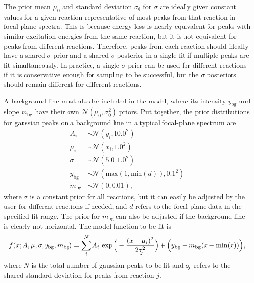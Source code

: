 The prior mean $\mu_{0}$ and standard deviation $\sigma_{0}$ for $\sigma$ are ideally given constant values for a given reaction representative of most peaks from that reaction in focal-plane spectra. This is because energy loss is nearly equivalent for peaks with similar excitation energies from the same reaction, but it is not equivalent for peaks from different reactions. Therefore, peaks from each reaction should ideally have a shared $\sigma$ prior and a shared $\sigma$ posterior in a single fit if multiple peaks are fit simultaneously. In practice, a single $\sigma$ prior can be used for different reactions if it is conservative enough for sampling to be successful, but the $\sigma$ posteriors should remain different for different reactions. 

A background line must also be included in the model, where its intensity $y_{\mathrm{bg}}$ and slope $m_{\mathrm{bg}}$ have their own $\mathcal{N}(\mu_{0}, \sigma_{0}^{2})$ priors. Put together, the prior distributions for gaussian peaks on a background line in a typical focal-plane spectrum are
\begin{align}
    A_{i} &\sim \mathcal{N}(y_{i}, 10.0^{2}) \nonumber \\
    \mu_{i} &\sim \mathcal{N}(x_{i}, 1.0^{2}) \nonumber \\
    \sigma &\sim \mathcal{N}(5.0, 1.0^{2}) \nonumber \\
    y_{\mathrm{bg}} &\sim \mathcal{N}(\mathrm{max}(1, \mathrm{min}(d)), 0.1^{2}) \nonumber \\
    m_{\mathrm{bg}} &\sim \mathcal{N}(0, 0.01), \label{eqn:gaus_priors}
\end{align}
where $\sigma$ is a constant prior for all reactions, but it can easily be adjusted by the user for different reactions if needed, and $d$ refers to the focal-plane data in the specified fit range. The prior for $m_{\mathrm{bg}}$ can also be adjusted if the background line is clearly not horizontal. The model function to be fit is
\begin{equation}
    f(x;A,\mu,\sigma,y_{\mathrm{bg}},m_{\mathrm{bg}}) = \sum_{i}^{N} A_{i} \, \exp \Big( -\frac{(x-\mu_{i})^{2}}{2\sigma_{\hspace{-0.08cm} j}^{2}} \Big) + \Big(y_{\mathrm{bg}} + m_{\mathrm{bg}} (x - \mathrm{min}(x))\Big), \label{eqn:nGausBkg}
\end{equation}
where $N$ is the total number of gaussian peaks to be fit and $\sigma_{\hspace{-0.08cm} j}$ refers to the shared standard deviation for peaks from reaction $j$.

